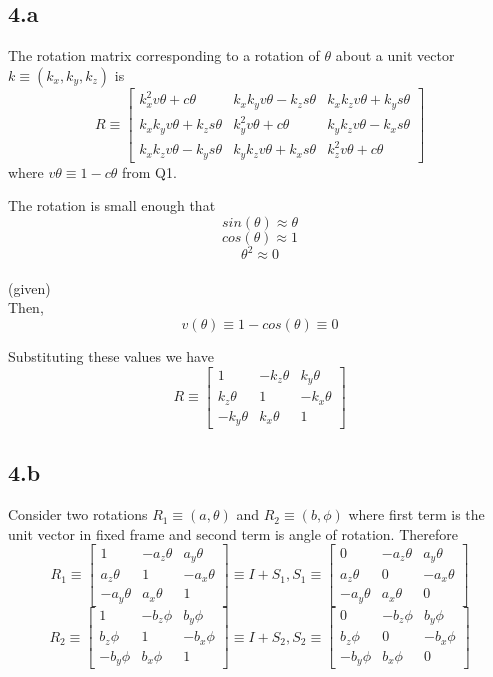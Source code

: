 \documentclass[12pt]{article}
\newcommand{\given}{{\\ \color{blue} \hspace*{\fill}(given)} \\}
\begin{document}
\section{}
\subsection*{4.a}
The rotation matrix corresponding to a rotation of $\theta$ about a unit vector $ k \equiv (k_x, k_y, k_z)$ is
\[
  R \equiv
  \begin{bmatrix}
    k_x^2v\theta + c\theta & k_xk_yv\theta - k_zs\theta & k_xk_zv\theta + k_ys\theta\\
    k_xk_yv\theta + k_zs\theta & k_y^2v\theta + c\theta & k_yk_zv\theta - k_xs\theta \\
    k_xk_zv\theta - k_ys\theta & k_yk_zv\theta + k_xs\theta & k_z^2v\theta + c\theta
  \end{bmatrix}
\]
where $v\theta \equiv 1 - c\theta$ from Q1.

The rotation is small enough that
\[
  sin(\theta) \approx \theta
\]
\[
  cos(\theta) \approx 1
\]
\[
  \theta^2 \approx 0
\]
\given

Then,
\[
  v(\theta) \equiv 1 - cos(\theta) \equiv 0
\]

Substituting these values we have
\[
  R \equiv
  \begin{bmatrix}
    1 & -k_z\theta & k_y\theta\\
     k_z\theta & 1 & -k_x\theta \\
     -k_y\theta & k_x\theta & 1
  \end{bmatrix}
\]
\pagebreak

\subsection*{4.b}
Consider two rotations $R_1 \equiv (a, \theta)$ and $R_2 \equiv (b, \phi)$ where first term is the unit vector in fixed frame and second term is angle of rotation.
Therefore
\[
  R_1 \equiv
  \begin{bmatrix}
    1 & -a_z\theta & a_y\theta\\
     a_z\theta & 1 & -a_x\theta \\
     -a_y\theta & a_x\theta & 1
  \end{bmatrix}
  \equiv
  I + S_1
  ,
  S_1 \equiv
  \begin{bmatrix}
    0 & -a_z\theta & a_y\theta\\
     a_z\theta & 0 & -a_x\theta \\
     -a_y\theta & a_x\theta & 0
  \end{bmatrix}
\]
\[
  R_2 \equiv
  \begin{bmatrix}
    1 & -b_z\phi & b_y\phi\\
     b_z\phi & 1 & -b_x\phi \\
     -b_y\phi & b_x\phi & 1
  \end{bmatrix}
  \equiv
  I + S_2
  ,
  S_2 \equiv
  \begin{bmatrix}
    0 & -b_z\phi & b_y\phi\\
     b_z\phi & 0 & -b_x\phi \\
     -b_y\phi & b_x\phi & 0
  \end{bmatrix}
\]
\end{document}
